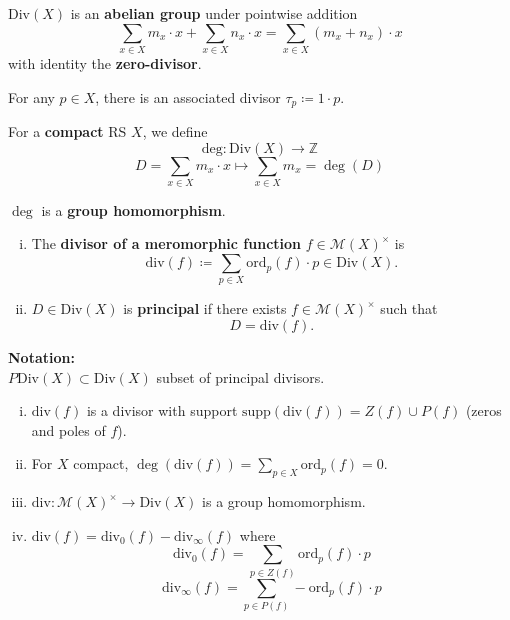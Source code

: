 \documentclass{article}
\begin{document}
\begin{remark}
    $\text{Div}(X)$ is an \textbf{abelian group} under pointwise addition
    $$\sum_{x \in X} m_x \cdot x + \sum_{x \in X} n_x \cdot x = \sum_{x \in X} (m_x + n_x) \cdot x$$
    with identity the \textbf{zero-divisor}.
\end{remark}

\begin{example}
    For any $p \in X$, there is an associated divisor $\tau_p \coloneqq 1 \cdot p$.
\end{example}

\begin{definition}
    For a \textbf{compact} RS $X$, we define
    $$\text{deg}: \text{Div}(X) \to \mathbb{Z}$$
    $$D = \sum_{x \in X} m_x \cdot x \mapsto \sum_{x \in X} m_x = \deg(D)$$
\end{definition}

\begin{remark}
    $\deg$ is a \textbf{group homomorphism}.
\end{remark}

\begin{definition}
    \begin{enumerate}[(i)]
        \item The \textbf{divisor of a meromorphic function} $f \in \mathcal{M}(X)^\times$ is
        $$\text{div}(f) \coloneqq \sum_{p \in X} \text{ord}_p(f) \cdot p \in \text{Div}(X).$$
        \item $D \in \text{Div}(X)$ is \textbf{principal} if there exists $f \in \mathcal{M}(X)^\times$ such that
        $$D = \text{div}(f).$$
    \end{enumerate}
\end{definition}

\noindent \textbf{Notation:}\\
    $P\text{Div}(X) \subset \text{Div}(X)$ subset of principal divisors.


\begin{remark}
    \begin{enumerate}[(i)]
        \item $\text{div}(f)$ is a divisor with support $\text{supp}(\text{div}(f)) = Z(f) \cup P(f)$ (zeros and poles of $f$).
        \item For $X$ compact, $\deg(\text{div}(f)) = \sum_{p \in X} \text{ord}_p(f) = 0$.
        \item $\text{div}: \mathcal{M}(X)^\times \to \text{Div}(X)$ is a group homomorphism.
        \item $\text{div}(f) = \text{div}_0(f) - \text{div}_\infty(f)$ where
        $$\text{div}_0(f) = \sum_{p \in Z(f)} \text{ord}_p(f) \cdot p$$
        $$\text{div}_\infty(f) = \sum_{p \in P(f)} -\text{ord}_p(f) \cdot p$$
    \end{enumerate}
\end{remark}
\end{document}
